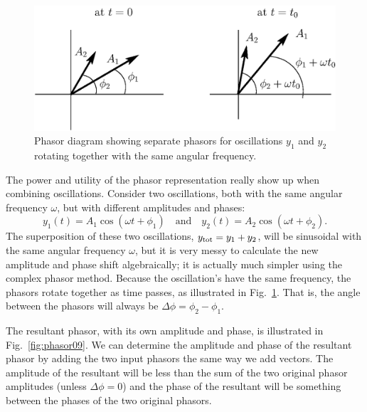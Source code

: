 \begin{figure}[b]
\begin{center}
\includegraphics[width=4.2truein]{phasors/phasor08} 
\caption{\label{fig:phasor08}Phasor diagram showing separate phasors 
for oscillations $y_1$ and $y_2$ rotating together with the 
same angular frequency.}
\end{center}
\end{figure}
%

The power and utility of the phasor representation really show up
when combining oscillations. Consider two oscillations, both with the
same angular frequency $\omega$, but with different amplitudes and
phases:
\begin{equation}
y_1(t) = A_1\cos{(\omega t + \phi_1)}\quad \text{and} \quad
y_2(t) = A_2\cos{(\omega t + \phi_2)}.  
\end{equation}
The superposition of these two oscillations, $y_{\rm tot} = y_1 + y_2$,
will be sinusoidal with the same angular frequency $\omega$, 
but it is very messy to calculate the new amplitude and phase shift  
algebraically; it is actually much simpler
using the complex phasor method. Because the oscillation's have 
the same frequency, the phasors rotate together as time passes,
as illustrated in Fig.~\ref{fig:phasor08}.  That is, the angle
between the phasors will always be $\Delta\phi = \phi_2-\phi_1$.



The resultant phasor, with its own amplitude and phase, is illustrated
in Fig.~\ref{fig:phasor09}.  We can determine the amplitude and phase
of the resultant phasor by adding the two input phasors the same way we
add vectors.  The amplitude of the resultant will be less than the sum
of the two original phasor amplitudes (unless $\Delta\phi = 0$) and the
phase of the resultant will be something between the phases of the two
original phasors.


